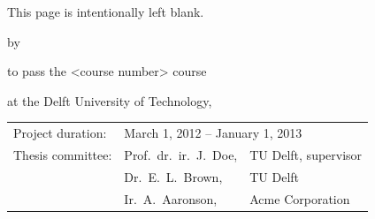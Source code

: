 \thispagestyle{empty}
\vspace{2cm}
\begin{center}
    This page is intentionally left blank.
\end{center}
\newpage


\begin{titlepage}


\begin{center}


{\makeatletter
\largetitlestyle\fontsize{64}{94}\selectfont\@title
\makeatother}

{\makeatletter
\ifx\@subtitle\undefined\else
    \bigskip
   {\tudsffamily\fontsize{22}{32}\selectfont\@subtitle}    
\fi
\makeatother}

\bigskip
\bigskip

by

\bigskip
\bigskip

{\makeatletter
\largetitlestyle\fontsize{26}{26}\selectfont\@author
\makeatother}

\bigskip
\bigskip

to pass the <course number> course


at the Delft University of Technology,


\vfill

\begin{tabular}{lll}
    Project duration: & \multicolumn{2}{l}{March 1, 2012 -- January 1, 2013} \\
    Thesis committee: & Prof.\ dr.\ ir.\ J.\ Doe, & TU Delft, supervisor \\
        & Dr.\ E.\ L.\ Brown, & TU Delft \\
        & Ir.\ A.\ Aaronson, & Acme Corporation
\end{tabular}


\end{center}


\end{titlepage}

